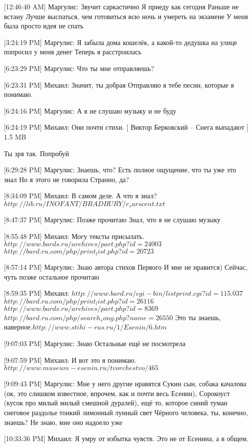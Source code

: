 \documentclass{article}
\begin{document}
[12:46:40 AM] Маргулис:
Звучит саркастично
 Я приеду как сегодня
 Раньше не встану
 Лучше выспаться, чем готовиться всю ночь и умереть на экзамене
 У меня была просто идея не спать

[3:24:19 PM] Маргулис:
Я забыла дома кошелёк, а какой-то дедушка на улице попросил у меня денег
 Теперь я расстроилась

[6:23:29 PM] Маргулис:
Что ты мне отправляешь?

[6:23:31 PM] Михаил:
Значит, ты добрая
 Отправляю я тебе песни, которые я понимаю.

[6:24:16 PM] Маргулис:
А я не слушаю музыку и не буду

[6:24:19 PM] Михаил:
Они почти стихи.
[ Виктор Берковский – Снега выпадают  ] 1.5 MB
 
 Ты зря так.
 Попробуй

[6:29:28 PM] Маргулис:
Знаешь, что? Есть полное ощущение, что ты уже это знал 
Но я этого не говорила
Странно, да?

[8:34:09 PM] Михаил:
В самом деле. А что я знал?
$ http://lib.ru/INOFANT/BRADBURY/r_sarscent.txt$

[8:47:37 PM] Маргулис:
Позже прочитаю
 Знал, что я не слушаю музыку

[8:55:48 PM] Михаил:
Могу тексты присылать. 
$http://www.bards.ru/archives/part.php?id=24003$
$ http://bard.ru.com/php/print_list.php?id=20723$

[8:57:14 PM] Маргулис:
Знаю автора стихов
 Первого
 И мне не нравится)
 Сейчас, чуть позже остальное прочитаю

[8:59:35 PM] Михаил:
$http://www.bard.ru/cgi-bin/listprint.cgi?id=115.037$
 $http://bard.ru.com/php/print_list.php?id=26116$
 $http://www.bards.ru/archives/part.php?id=8369$
 $http://bard.ru.com/php/search_song.php?name=26550$
 Это ты знаешь, наверное.$ http://www.stihi-rus.ru/1/Esenin/6.htm$

[9:07:03 PM] Маргулис:
Знаю
 Остальные ещё не посмотрела

[9:07:59 PM] Михаил:
И вот это я понимаю. $http://www.museum-esenin.ru/tvorchestvo/465$

[9:09:43 PM] Маргулис:
Мне у него другие нравятся
 Сукин сын, собака качалова (ок, это слишком известное, впрочем, как и почти весь Есенин), Сорокоуст (кусок про милый милый смешной дуралей), ещё то, которое синий туман снеговое раздолье тонкий лимонный лунный свет
 Чёрного человека, ты, конечно, знаешь? Не знаю, мне оно надоело уже

[10:33:36 PM] Михаил:
Я умру от избытка чувств.
 Это не от Есенина, а в общем.
\end{document}
